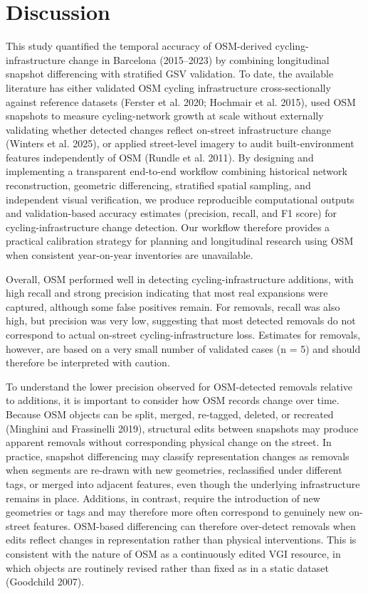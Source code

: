\documentclass[
]{article}
\begin{document}
\section{Discussion}\label{discussion}

This study quantified the temporal accuracy of OSM-derived
cycling-infrastructure change in Barcelona (2015--2023) by combining
longitudinal snapshot differencing with stratified GSV validation. To
date, the available literature has either validated OSM cycling
infrastructure cross-sectionally against reference datasets (Ferster et
al. 2020; Hochmair et al. 2015), used OSM snapshots to measure
cycling-network growth at scale without externally validating whether
detected changes reflect on-street infrastructure change (Winters et al.
2025), or applied street-level imagery to audit built-environment
features independently of OSM (Rundle et al. 2011). By designing and
implementing a transparent end-to-end workflow combining historical
network reconstruction, geometric differencing, stratified spatial
sampling, and independent visual verification, we produce reproducible
\color{black}computational outputs and validation-based accuracy
estimates \color{black} (precision, recall, and F1 score) for
cycling-infrastructure change detection. Our workflow therefore provides
a practical calibration strategy for planning and longitudinal research
using OSM when \color{black}consistent \color{black} year-on-year
inventories are unavailable.

\color{black}Overall, OSM performed well in detecting
cycling-infrastructure additions, with high recall and strong precision
indicating that most real expansions were captured, although some false
positives remain. For removals, recall was also high, but precision was
very low, suggesting that most detected removals do not correspond to
actual on-street cycling-infrastructure loss. Estimates for removals,
however, are based on a very small number of validated cases (n = 5) and
should therefore be interpreted with caution.\color{black}

To understand the lower precision observed for OSM-detected removals
relative to additions, it is important to consider how OSM records
change over time. Because OSM objects can be split, merged, re-tagged,
deleted, or recreated (Minghini and Frassinelli 2019), structural edits
between snapshots may produce apparent removals without corresponding
physical change on the street. In practice, snapshot differencing may
classify representation changes as removals when segments are re-drawn
with new geometries, reclassified under different tags, or merged into
adjacent features, even though the underlying infrastructure remains in
place. Additions, in contrast, require the introduction of new
geometries or tags and may therefore more often correspond to genuinely
new on-street features. OSM-based differencing can therefore over-detect
removals when edits reflect changes in representation rather than
physical interventions. This is consistent with the nature of OSM as a
continuously edited VGI resource, in which objects are routinely revised
rather than fixed as in a static dataset (Goodchild 2007).
\end{document}
